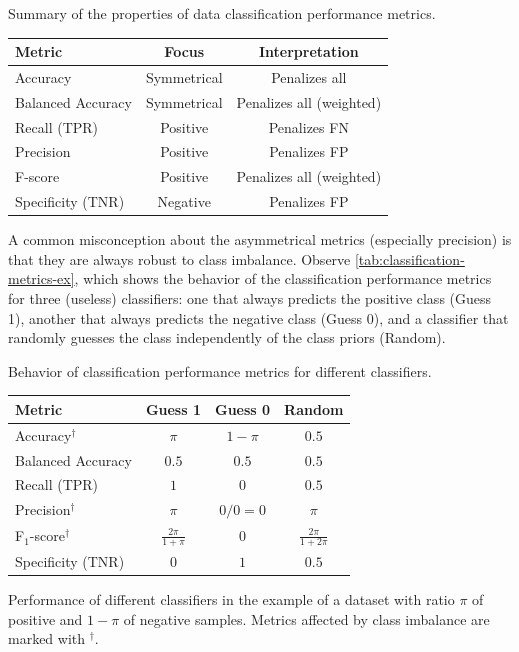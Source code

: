 \begin{tablebox}[label=tab:classification-metrics]{Summary of the properties of
  data classification performance metrics.}
  \centering
  \begin{tabular}{l c c}
    \toprule
    \textbf{Metric} & \textbf{Focus} & \textbf{Interpretation} \\
    \midrule
    Accuracy           & Symmetrical & Penalizes all \\
    Balanced Accuracy  & Symmetrical & Penalizes all (weighted) \\
    Recall (TPR)       & Positive & Penalizes FN \\
    Precision          & Positive & Penalizes FP \\
    F-score            & Positive & Penalizes all (weighted) \\
    Specificity (TNR)  & Negative & Penalizes FP \\
    \bottomrule
  \end{tabular}
\end{tablebox}

A common misconception about the asymmetrical metrics (especially precision) is that they
are always robust to class imbalance.  Observe \cref{tab:classification-metrics-ex}, which shows
the behavior of the classification performance metrics for three (useless) \glspl{classifier}: one
that always predicts the positive class (Guess 1), another that always predicts the
negative class (Guess 0), and a \gls{classifier} that randomly guesses the class independently
of the class priors (Random).

\begin{tablebox}[label=tab:classification-metrics-ex]{Behavior of classification
  performance metrics for different \glspl{classifier}.}
  \centering
  \begin{tabular}{l c c c}
    \toprule
    \textbf{Metric} & \textbf{Guess 1} & \textbf{Guess 0} & \textbf{Random} \\
    \midrule
    Accuracy$^\dagger$ & $\pi$ & $1 - \pi$ & $0.5$ \\
    Balanced Accuracy & $0.5$ & $0.5$ & $0.5$ \\
    Recall (TPR) & $1$ & $0$ & $0.5$ \\
    Precision$^\dagger$ & $\pi$ & $0/0 = 0$ & $\pi$ \\
    F$_1$-score$^\dagger$ & $\frac{2 \pi}{1 + \pi}$ & 0 & $\frac{2 \pi}{1 + 2\pi}$ \\
    Specificity (TNR) & $0$ & $1$ & $0.5$ \\
    \bottomrule
  \end{tabular}
  \tcblower
  Performance of different \glspl{classifier} in the example of a dataset with ratio $\pi$ of
  positive and $1-\pi$ of negative samples.  Metrics affected by class imbalance are
  marked with $^\dagger$.
\end{tablebox}

